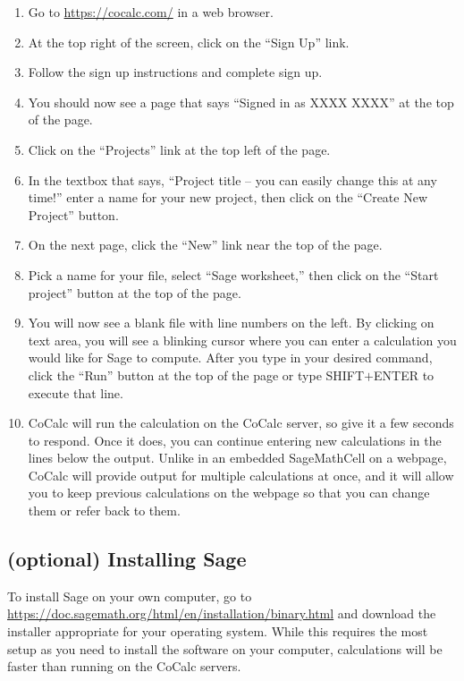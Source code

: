 \documentclass[12pt]{amsart}
\theoremstyle{definition}
\theoremstyle{definition}
\begin{document}
\begin{enumerate}
	\item Go to \url{https://cocalc.com/} in a web browser.
	\item At the top right of the screen, click on the ``Sign Up''
		link.
	\item Follow the sign up instructions and complete
		sign up.
	\item You should now see a page that says ``Signed in as
		XXXX XXXX'' at the top of the page.
	\item Click on the ``Projects'' link at the top left of the page.
	\item In the textbox that says, ``Project title -- you can easily change
		this at any time!'' enter a name for your new project, then
		click on the ``Create New Project'' button.
	\item On the next page, click the ``New'' link near the top
		of the page.
	\item Pick a name for your file, select ``Sage worksheet,''
		then click on the ``Start project'' button at the top of the page.
	\item You will now see a blank file with line numbers on the left.
		By clicking on text area, you will see a blinking cursor where you
		can enter a calculation you would like for Sage to compute.
		After you type in your desired command, click the ``Run'' button
		at the top of the page or type SHIFT$+$ENTER to execute
		that line.
	\item CoCalc will run the calculation on the CoCalc server, so give it
		a few seconds to respond. Once it does, you can continue entering
		new calculations in the lines below the output. Unlike in an
		embedded SageMathCell on a webpage, CoCalc will provide
		output for multiple calculations at once, and it will allow you to
		keep previous calculations on the webpage so that you can
		change them or refer back to them.
\end{enumerate}

\subsection{(optional) Installing Sage}

To install Sage on your own computer, go to
\url{https://doc.sagemath.org/html/en/installation/binary.html} and
download the installer appropriate for your operating system.
While this requires the most setup as you need to install the
software on your computer, calculations will be faster than
running on the CoCalc servers.
\end{document}
